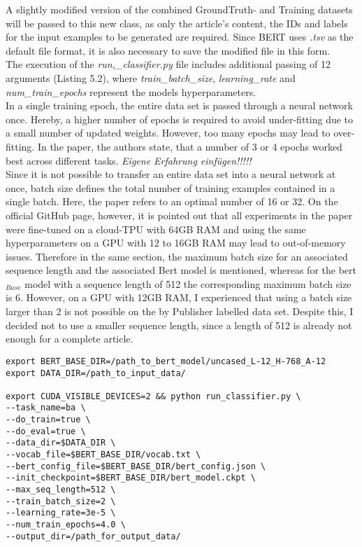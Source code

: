 \documentclass[a4paper, 11pt,titlepage,oneside,openany]{book}
\begin{document}
A slightly modified version of the combined GroundTruth- and Training datasets will be passed to this new class, as only the article's content, the IDs and labels for the input examples to be generated are required. Since BERT uses \textit{.tsv} as the default file format, it is also necessary to save the modified file in this form. \\
\noindent The execution of the \textit{run,\_classifier.py} file includes additional passing of 12 arguments (Listing 5.2), where \textit{train\_batch\_size}, \textit{learning\_rate} and \textit{num\_train\_epochs} represent the models hyperparameters. \\
\noindent In a  single training epoch, the entire data set is passed through a neural network once. Hereby, a higher number of epochs is required to avoid under-fitting due to a small number of updated weights. However, too many epochs may lead to over-fitting. In the paper, the authors state, that a number of  3 or 4 epochs worked best across different tasks. \textit{Eigene Erfahrung einfügen!!!!!} \\
\noindent Since it is not possible to transfer an entire data set into a neural network at once, batch size defines the total number of training examples contained in a single batch. Here, the paper refers  to an optimal number of 16 or 32. On the official GitHub page, however, it is pointed out that all experiments in the paper were fine-tuned on a cloud-TPU with 64GB RAM and using the same hyperparameters  on a GPU with 12 to 16GB RAM may lead to out-of-memory issues. Therefore in the same section, the maximum batch size for an associated sequence length and the associated Bert model is mentioned, whereas for the \gls{bert}$_{Base}$ model with a sequence length of 512 the corresponding maximum batch size is 6. However, on
a GPU with 12GB RAM, I  experienced that using a batch size larger than 2 is not possible on the by Publisher labelled data set. Despite this, I decided not to use a smaller sequence length, since a length of 512 is already not enough for a complete article. \\
\begin{lstlisting}[caption={Example: Calling \textit{run\_classifier} with the required flags},captionpos=b, frame = single]
export BERT_BASE_DIR=/path_to_bert_model/uncased_L-12_H-768_A-12
export DATA_DIR=/path_to_input_data/

export CUDA_VISIBLE_DEVICES=2 && python run_classifier.py \
--task_name=ba \
--do_train=true \
--do_eval=true \
--data_dir=$DATA_DIR \
--vocab_file=$BERT_BASE_DIR/vocab.txt \
--bert_config_file=$BERT_BASE_DIR/bert_config.json \
--init_checkpoint=$BERT_BASE_DIR/bert_model.ckpt \
--max_seq_length=512 \
--train_batch_size=2 \
--learning_rate=3e-5 \
--num_train_epochs=4.0 \
--output_dir=/path_for_output_data/
\end{lstlisting}
\end{document}

